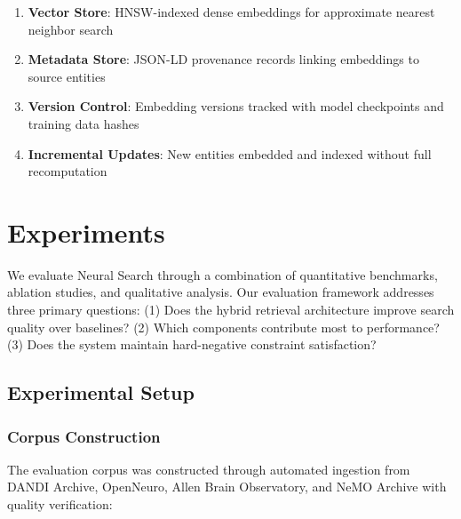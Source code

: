 \documentclass{article}
\theoremstyle{definition}
\begin{document}
\begin{enumerate}
    \item \textbf{Vector Store}: HNSW-indexed dense embeddings for approximate nearest neighbor search
    \item \textbf{Metadata Store}: JSON-LD provenance records linking embeddings to source entities
    \item \textbf{Version Control}: Embedding versions tracked with model checkpoints and training data hashes
    \item \textbf{Incremental Updates}: New entities embedded and indexed without full recomputation
\end{enumerate}

\section{Experiments}
\label{sec:experiments}

We evaluate Neural Search through a combination of quantitative benchmarks, ablation studies, and qualitative analysis. Our evaluation framework addresses three primary questions: (1) Does the hybrid retrieval architecture improve search quality over baselines? (2) Which components contribute most to performance? (3) Does the system maintain hard-negative constraint satisfaction?

\subsection{Experimental Setup}

\subsubsection{Corpus Construction}

The evaluation corpus was constructed through automated ingestion from DANDI Archive, OpenNeuro, Allen Brain Observatory, and NeMO Archive with quality verification:
\end{document}
